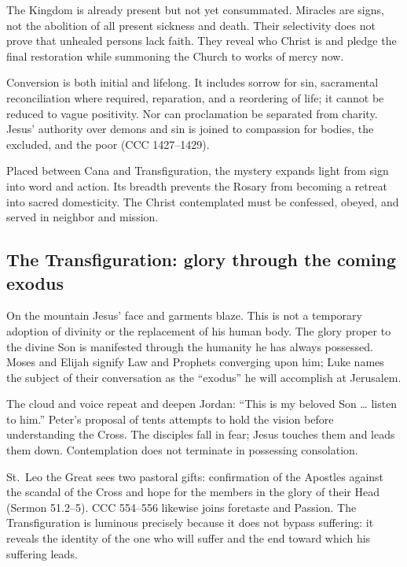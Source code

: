 The Kingdom is already present but not yet consummated. Miracles are signs, not the abolition of all present sickness and death. Their selectivity does not prove that unhealed persons lack faith. They reveal who Christ is and pledge the final restoration while summoning the Church to works of mercy now.

Conversion is both initial and lifelong. It includes sorrow for sin, sacramental reconciliation where required, reparation, and a reordering of life; it cannot be reduced to vague positivity. Nor can proclamation be separated from charity. Jesus' authority over demons and sin is joined to compassion for bodies, the excluded, and the poor (CCC 1427--1429).

Placed between Cana and Transfiguration, the mystery expands light from sign into word and action. Its breadth prevents the Rosary from becoming a retreat into sacred domesticity. The Christ contemplated must be confessed, obeyed, and served in neighbor and mission.

\subsection{The Transfiguration: glory through the coming exodus}


On the mountain Jesus' face and garments blaze. This is not a temporary adoption of divinity or the replacement of his human body. The glory proper to the divine Son is manifested through the humanity he has always possessed. Moses and Elijah signify Law and Prophets converging upon him; Luke names the subject of their conversation as the ``exodus'' he will accomplish at Jerusalem.

The cloud and voice repeat and deepen Jordan: ``This is my beloved Son … listen to him.'' Peter's proposal of tents attempts to hold the vision before understanding the Cross. The disciples fall in fear; Jesus touches them and leads them down. Contemplation does not terminate in possessing consolation.

St.~Leo the Great sees two pastoral gifts: confirmation of the Apostles against the scandal of the Cross and hope for the members in the glory of their Head (Sermon 51.2--5). CCC 554--556 likewise joins foretaste and Passion. The Transfiguration is luminous precisely because it does not bypass suffering: it reveals the identity of the one who will suffer and the end toward which his suffering leads.

